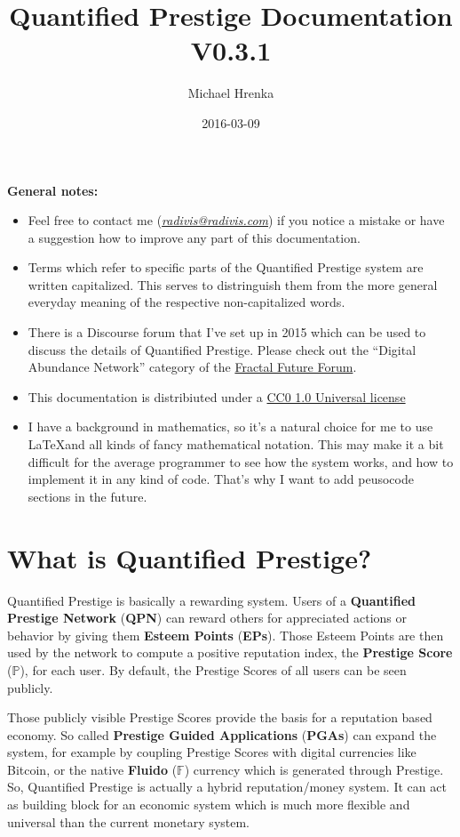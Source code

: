 \documentclass[a4paper,12pt]{scrartcl}
\title{Quantified Prestige Documentation V0.3.1}
\author{Michael Hrenka}
\date{2016-03-09}
\newcounter{example}
\begin{document}
\maketitle

\textbf{General notes:}
\begin{itemize}
 \item Feel free to contact me (\href{mailto:radivis@radivis.com}{\textit{radivis@radivis.com}}) if you notice a mistake or have a suggestion how to improve any part of this documentation.
 \item Terms which refer to specific parts of the Quantified Prestige system are written capitalized. This serves to distringuish them from the more general everyday meaning of the respective non-capitalized words.
 \item There is a Discourse forum that I've set up in 2015 which can be used to discuss the details of Quantified Prestige. Please check out the ``Digital Abundance Network'' category of the \href{http://forum.fractalfuture.net}{Fractal Future Forum}.
 \item This documentation is distribiuted under a \href{http://creativecommons.org/publicdomain/zero/1.0/}{CC0 1.0 Universal license}
 \item I have a background in mathematics, so it's a natural choice for me to use \LaTeX and all kinds of fancy mathematical notation. This may make it a bit difficult for the average programmer to see how the system works, and how to implement it in any kind of code. That's why I want to add peusocode sections in the future.
 \end{itemize}


\tableofcontents

\part{What is Quantified Prestige?}

Quantified Prestige is basically a rewarding system. Users of a \textbf{Quantified Prestige Network} (\textbf{QPN}) can reward others for appreciated actions or behavior by giving them \textbf{Esteem Points} (\textbf{EPs}). Those Esteem Points are then used by the network to compute a positive reputation index, the \textbf{Prestige Score} ($\mathbb{P}$), for each user. By default, the Prestige Scores of all users can be seen publicly.

Those publicly visible Prestige Scores provide the basis for a reputation based economy. So called \textbf{Prestige Guided Applications} (\textbf{PGAs}) can expand the system, for example by coupling Prestige Scores with digital currencies like Bitcoin, or the native \textbf{Fluido} ($\mathbb{F}$) currency which is generated through Prestige. So, Quantified Prestige is actually a hybrid reputation/money system. It can act as building block for an economic system which is much more flexible and universal than the current monetary system.
\end{document}

